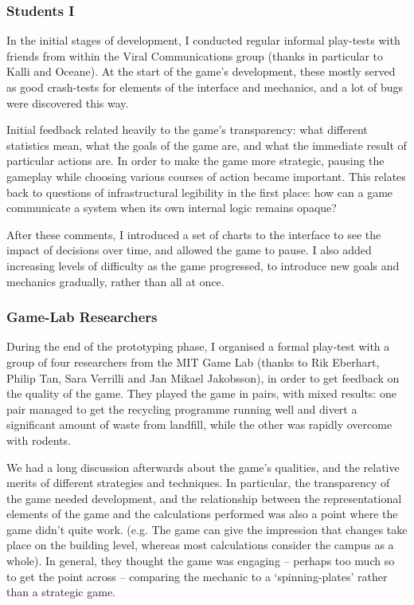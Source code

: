 \documentclass[nofonts,nols,justified,nobib]{tufte-book}
\begin{document}
\subsubsection*{Students I}

In the initial stages of development, I conducted regular informal play-tests with friends from within the Viral Communications group (thanks in particular to Kalli and Oceane). At the start of the game's development, these mostly served as good crash-tests for elements of the interface and mechanics, and a lot of bugs were discovered this way.

Initial feedback related heavily to the game's transparency: what different statistics mean, what the goals of the game are, and what the immediate result of particular actions are. In order to make the game more strategic, pausing the gameplay while choosing various courses of action became important. This relates back to questions of infrastructural legibility in the first place: how can a game communicate a system when its own internal logic remains opaque?

After these comments, I introduced a set of charts to the interface to see the impact of decisions over time, and allowed the game to pause. I also added increasing levels of difficulty as the game progressed, to introduce new goals and mechanics gradually, rather than all at once.

\subsubsection*{Game-Lab Researchers}

During the end of the prototyping phase, I organised a formal play-test with a group of four researchers from the MIT Game Lab (thanks to Rik Eberhart, Philip Tan, Sara Verrilli and Jan Mikael Jakobsson), in order to get feedback on the quality of the game. They played the game in pairs, with mixed results: one pair managed to get the recycling programme running well and divert a significant amount of waste from landfill, while the other was rapidly overcome with rodents.


We had a long discussion afterwards about the game's qualities, and the relative merits of different strategies and techniques. In particular, the transparency of the game needed development, and the relationship between the representational elements of the game and the calculations performed was also a point where the game didn't quite work. (e.g. The game can give the impression that changes take place on the building level, whereas most calculations consider the campus as a whole). In general, they thought the game was engaging -- perhaps too much so to get the point across -- comparing the mechanic to a `spinning-plates' rather than a strategic game.
\end{document}

